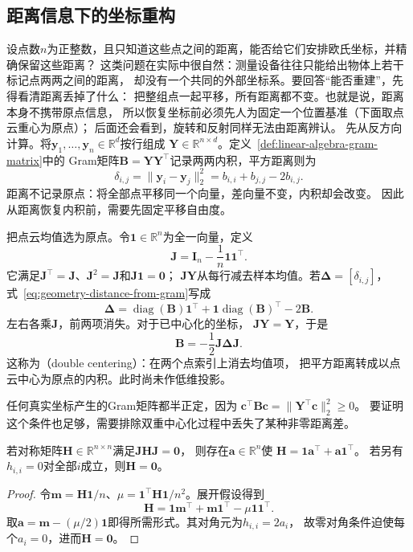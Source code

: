 \subsection{距离信息下的坐标重构}
\label{sec:geometry-distance-coordinate-embedding}

设点数$n$为正整数，且只知道这些点之间的距离，能否给它们安排欧氏坐标，并精确保留这些距离？
这类问题在实际中很自然：测量设备往往只能给出物体上若干标记点两两之间的距离，
却没有一个共同的外部坐标系。要回答“能否重建”，先得看清距离丢掉了什么：
把整组点一起平移，所有距离都不变。也就是说，距离本身不携带原点信息，
所以恢复坐标前必须先人为固定一个位置基准（下面取点云重心为原点）；
后面还会看到，旋转和反射同样无法由距离辨认。
先从反方向计算。将$\bm y_1,\ldots,\bm y_n\in\mathbb R^d$按行组成
$\bm Y\in\mathbb R^{n\times d}$。定义~\ref{def:linear-algebra-gram-matrix}中的
Gram矩阵$\bm B=\bm Y\bm Y^\top$记录两两内积，平方距离则为
\begin{equation}
  \delta_{i,j}=\lVert\bm y_i-\bm y_j\rVert_2^2
  =b_{i,i}+b_{j,j}-2b_{i,j}.
  \label{eq:geometry-distance-from-gram}
\end{equation}
距离不记录原点：将全部点平移同一个向量，差向量不变，内积却会改变。
因此从距离恢复内积前，需要先固定平移自由度。

把点云均值选为原点。令$\bm1\in\mathbb R^n$为全一向量，定义
\begin{equation}
  \bm J=\bm I_n-\frac1n\bm1\bm1^\top.
  \label{eq:geometry-centering-matrix}
\end{equation}
它满足$\bm J^\top=\bm J$、$\bm J^2=\bm J$和$\bm J\bm1=\bm0$；
$\bm J\bm Y$从每行减去样本均值。若$\bm\Delta=[\delta_{i,j}]$，
式~\eqref{eq:geometry-distance-from-gram}写成
\[
  \bm\Delta=\operatorname{diag}(\bm B)\bm1^\top
  +\bm1\operatorname{diag}(\bm B)^\top-2\bm B.
\]
左右各乘$\bm J$，前两项消失。对于已中心化的坐标，
$\bm J\bm Y=\bm Y$，于是
\begin{equation}
  \bm B=-\frac12\bm J\bm\Delta\bm J.
  \label{eq:geometry-double-centering}
\end{equation}
这称为（double centering）：在两个点索引上消去均值项，
把平方距离转成以点云中心为原点的内积。此时尚未作低维投影。

任何真实坐标产生的Gram矩阵都半正定，因为
$\bm c^\top\bm B\bm c=\lVert\bm Y^\top\bm c\rVert_2^2\geq0$。
要证明这个条件也足够，需要排除双重中心化过程中丢失了某种非零距离差。

\begin{lemma}[双重中心化核的形式]
\label{lem:geometry-double-centering-kernel}
若对称矩阵$\bm H\in\mathbb R^{n\times n}$满足$\bm J\bm H\bm J=\bm0$，
则存在$\bm a\in\mathbb R^n$使
$\bm H=\bm1\bm a^\top+\bm a\bm1^\top$。
若另有$h_{i,i}=0$对全部$i$成立，则$\bm H=\bm0$。
\end{lemma}
\begin{proof}
令$\bm m=\bm H\bm1/n$、$\mu=\bm1^\top\bm H\bm1/n^2$。展开假设得到
\[
  \bm H=\bm1\bm m^\top+\bm m\bm1^\top-\mu\bm1\bm1^\top.
\]
取$\bm a=\bm m-(\mu/2)\bm1$即得所需形式。其对角元为$h_{i,i}=2a_i$，
故零对角条件迫使每个$a_i=0$，进而$\bm H=\bm0$。
\end{proof}

